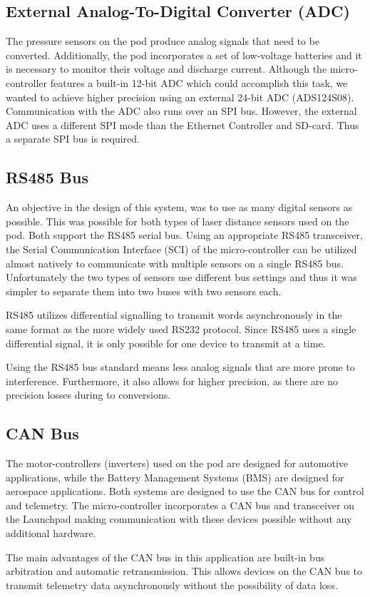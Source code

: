 \subsection{External Analog-To-Digital Converter (ADC)}

The pressure sensors on the pod produce analog signals that need to be converted. Additionally, the pod incorporates a set of low-voltage batteries and it is necessary to monitor their voltage and discharge current. Although the micro-controller features a built-in 12-bit ADC which could accomplish this task, we wanted to achieve higher precision using an external 24-bit ADC (ADS124S08). Communication with the ADC also runs over an SPI bus. However, the external ADC uses a different SPI mode than the Ethernet Controller and SD-card. Thus a separate SPI bus is required.

\subsection{RS485 Bus}

An objective in the design of this system, was to use as many digital sensors as possible. This was possible for both types of laser distance sensors used on the pod. Both support the RS485 serial bus. Using an appropriate RS485 transceiver, the Serial Communication Interface (SCI) of the micro-controller can be utilized almost natively to communicate with multiple sensors on a single RS485 bus. Unfortunately the two types of sensors use different bus settings and thus it was simpler to separate them into two buses with two sensors each.

RS485 utilizes differential signalling to transmit words asynchronously in the same format as the more widely used RS232 protocol. Since RS485 uses a single differential signal, it is only possible for one device to transmit at a time.

Using the RS485 bus standard means less analog signals that are more prone to interference. Furthermore, it also allows for higher precision, as there are no precision losses during to conversions.

\subsection{CAN Bus}

The motor-controllers (inverters) used on the pod are designed for automotive applications, while the Battery Management Systems (BMS) are designed for aerospace applications. Both systems are designed to use the CAN bus for control and telemetry. The micro-controller incorporates a CAN bus and transceiver on the Launchpad making communication with these devices possible without any additional hardware.

The main advantages of the CAN bus in this application are built-in bus arbitration and automatic retransmission. This allows devices on the CAN bus to transmit telemetry data asynchronously without the possibility of data loss.

